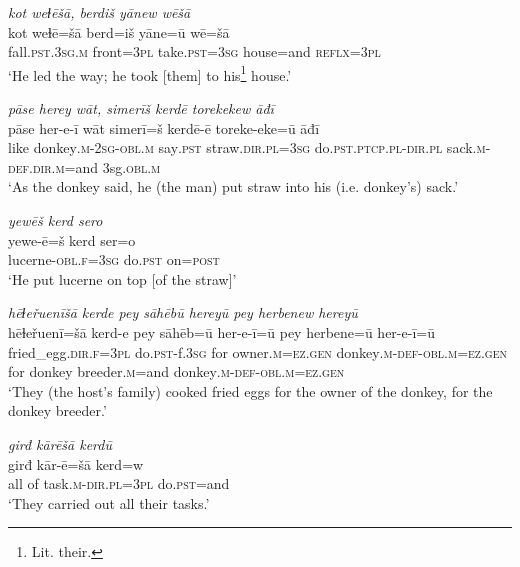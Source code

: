 \ea \label{HB.53}
\textit{kot weɫēšā, berdiš yānew wēšā} \\ 
\gll kot weɫē=šā berd=iš yāne=ū wē=šā \\ 
 fall\textsc{.pst}\textsc{.3sg}\textsc{.m} front\textsc{=3pl} take\textsc{.pst}\textsc{=3sg} house=and \textsc{reflx}\textsc{=3pl} \\ 
\glt `He led the way; he took [them] to his\footnote{Lit. their.} house.'
\z 
 
\ea \label{HB.54}
\textit{pāse herey wāt, simerīš kerdē torekekew āđī} \\ 
\gll pāse her-e-ī wāt simerī=š kerdē-ē toreke-eke=ū āđī \\ 
 like donkey\textsc{.m}-\textsc{2sg}\textsc{-obl}\textsc{.m} say\textsc{.pst} straw\textsc{.dir}\textsc{.pl}\textsc{=3sg} do\textsc{.pst}\textsc{.ptcp}\textsc{.pl}\textsc{-dir}\textsc{.pl} sack\textsc{.m}\textsc{-def}\textsc{.dir}\textsc{.m}=and 3sg\textsc{.obl}\textsc{.m} \\ 
\glt `As the donkey said, he (the man) put straw into his (i.e. donkey’s) sack.'
\z 
 
\ea \label{HB.55}
\textit{yewēš kerd sero} \\ 
\gll yewe-ē=š kerd ser=o \\ 
 lucerne\textsc{-obl}\textsc{\textsc{.f}}\textsc{=3sg} do\textsc{.pst} on\textsc{=\textsc{post}} \\ 
\glt `He put lucerne on top [of the straw]'
\z 
 
\ea \label{HB.56}
\textit{hēɫeřuenīšā kerde pey sāhēbū hereyū pey herbenew hereyū} \\ 
\gll hēɫeřuenī=šā kerd-e pey sāhēb=ū her-e-ī=ū pey herbene=ū her-e-ī=ū \\ 
 fried\_egg\textsc{.dir}\textsc{\textsc{.f}}\textsc{=3pl} do\textsc{.pst}-f\textsc{.3sg} for owner\textsc{.m}\textsc{=ez}\textsc{.gen} donkey\textsc{.m}\textsc{-def}\textsc{-obl}\textsc{.m}\textsc{=ez}\textsc{.gen} for donkey breeder\textsc{.m}=and donkey\textsc{.m}\textsc{-def}\textsc{-obl}\textsc{.m}\textsc{=ez}\textsc{.gen} \\ 
\glt `They (the host’s family) cooked fried eggs for the owner of the donkey, for the donkey breeder.'
\z 
 
\ea \label{HB.58}
\textit{girđ kārēšā kerdū} \\ 
\gll girđ kār-ē=šā kerd=w \\ 
 all of task\textsc{.m}\textsc{-dir}\textsc{.pl}\textsc{=3pl} do\textsc{.pst}=and \\ 
\glt `They carried out all their tasks.'
\z 
 
